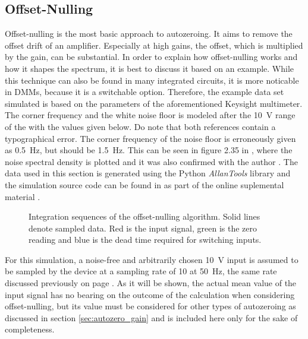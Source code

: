 \subsection{Offset-Nulling}
Offset-nulling is the most basic approach to autozeroing. It aims to remove the offset drift of an amplifier. Especially at high gains, the offset, which is multiplied by the gain, can be substantial. In order to explain how offset-nulling works and how it shapes the spectrum, it is best to discuss it based on an example. While this technique can also be found in many integrated circuits, it is more noticable in DMMs, because it is a switchable option. Therefore, the example data set simulated is based on the parameters of the aforementioned Keysight  multimeter. The corner frequency and the white noise floor is modeled after the \qty{10}{\V} range of the  \cite{3458A_noise_floor, sampling_with_3458A} with the values given below. Do note that both references \cite{3458A_noise_floor, sampling_with_3458A} contain a typographical error. The corner frequency of the noise floor is erroneously given as \qty{0.5}{\Hz}, but should be \qty{1.5}{\Hz}. This can be seen in figure 2.35 in \citep[p. 116]{sampling_with_3458A}, where the noise spectral density is plotted and it was also confirmed with the author \cite{lapuh_email_corner_frequency}. The data used in this section is generated using the Python \textit{AllanTools} library \cite{allantools} and the simulation source code can be found in  as part of the online suplemental material \cite{supplemental_material}.

\begin{figure}[ht]
    \centering
    \caption{Integration sequences of the offset-nulling algorithm. Solid lines denote sampled data. Red is the input signal, green is the zero reading and blue is the dead time required for switching inputs.}
    \label{fig:dmm_autozer_offset_nulling}
\end{figure}

For this simulation, a noise-free and arbitrarily chosen \qty{10}{\V} input is assumed to be sampled by the device at a sampling rate of \qty{10}{\plc} at \qty{50}{\Hz}, the same rate discussed previously on page \pageref{sec:dead_time}. As it will be shown, the actual mean value of the input signal has no bearing on the outcome of the calculation when considering offset-nulling, but its value must be considered for other types of autozeroing as discussed in section \ref{sec:autozero_gain} and is included here only for the sake of completeness.

